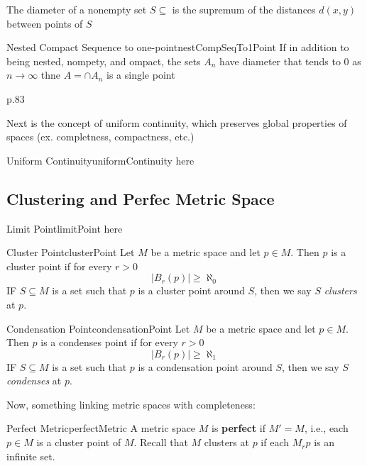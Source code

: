 \documentclass{book}
\newcommand{\sse}{\subseteq}
\newcommand{\rw}{\rightarrow}
\renewcommand{\bf}[1]{\textbf{#1}}
\newenvironment{Proof}[1][]
  {\begin{ProofTcb}[#1]}
  {\end{ProofTcb}}
\begin{document}
The diameter of a nonempty set $S \sse $ is the supremum of the distances $d(x,y)$ between points of $S$

\begin{cor}{Nested Compact Sequence to one-point}{nestCompSeqTo1Point}
	If in addition to being nested, nompety, and ompact, the sets $A_n$ have diameter that tends to $0$ as $n \rw
	\infty$ thne $A = \cap A_n$ is a single point
\end{cor}

\begin{Proof}
	p.83
\end{Proof}

Next is the concept of uniform continuity, which preserves global properties of spaces (ex. completness, compactness,
etc.)

\begin{defn}{Uniform Continuity}{uniformContinuity}
	here
\end{defn}

\subsection{Clustering and Perfec Metric Space}

\begin{defn}{Limit Point}{limitPoint}
	here
\end{defn}

\begin{defn}{Cluster Point}{clusterPoint}
	Let $M$ be a metric space and let $p \in M$. Then $p$ is a cluster point if for every $r > 0$
	\[
		|B_r(p)| \ge \aleph_0
	\]
	IF $S \sse M$ is a set such that $p$ is a cluster point around $S$, then we say $S$ \emph{clusters} at $p$.
\end{defn}

\begin{defn}{Condensation Point}{condensationPoint}
	Let $M$ be a metric space and let $p \in M$. Then $p$ is a condenses point if for every $r > 0$
	\[
		|B_r(p)| \ge \aleph_1
	\]
	IF $S \sse M$ is a set such that $p$ is a condensation point around $S$, then we say $S$ \emph{condenses} at $p$.

\end{defn}

Now, something linking metric spaces with completeness:


\begin{defn}{Perfect Metric}{perfectMetric}
	A metric space $M$ is \bf{perfect} if $M' = M$, i.e., each $p \in M$ is a cluster point of $M$. Recall that $M$
	clusters at $p$ if each $M_rp$ is an infinite set.
\end{defn}
\end{document}
